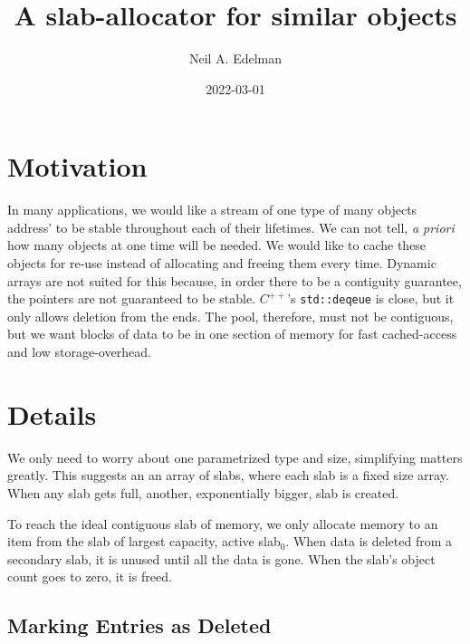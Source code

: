 \documentclass[12pt]{article}
\author{Neil A. Edelman}
\title{A slab-allocator for similar objects}
\date{2022-03-01}
\newcommand{\code}[1]{\colorbox{light-gray}{\texttt{#1}}}
\begin{document}
\maketitle


\section{Motivation}

In many applications, we would like a stream of one type of many objects address' to be stable throughout each of their lifetimes. We can not tell, {\it a priori} how many objects at one time will be needed. We would like to cache these objects for re-use instead of allocating and freeing them every time. Dynamic arrays are not suited for this because, in order there to be a contiguity guarantee, the pointers are not guaranteed to be stable. $C^{++}$'s \code{std::deqeue} is close, but it only allows deletion from the ends. The pool, therefore, must not be contiguous, but we want blocks of data to be in one section of memory for fast cached-access and low storage-overhead.

\section{Details}

We only need to worry about one parametrized type and size, simplifying matters greatly. This suggests an an array of slabs\cite{bonwick1994slab}, where each slab is a fixed size array. When any slab gets full, another, exponentially bigger, slab is created.

To reach the ideal contiguous slab of memory, we only allocate memory to an item from the slab of largest capacity, active slab$_0$. When data is deleted from a secondary slab, it is unused until all the data is gone. When the slab's object count goes to zero, it is freed.

\subsection{Marking Entries as Deleted}
\end{document}
